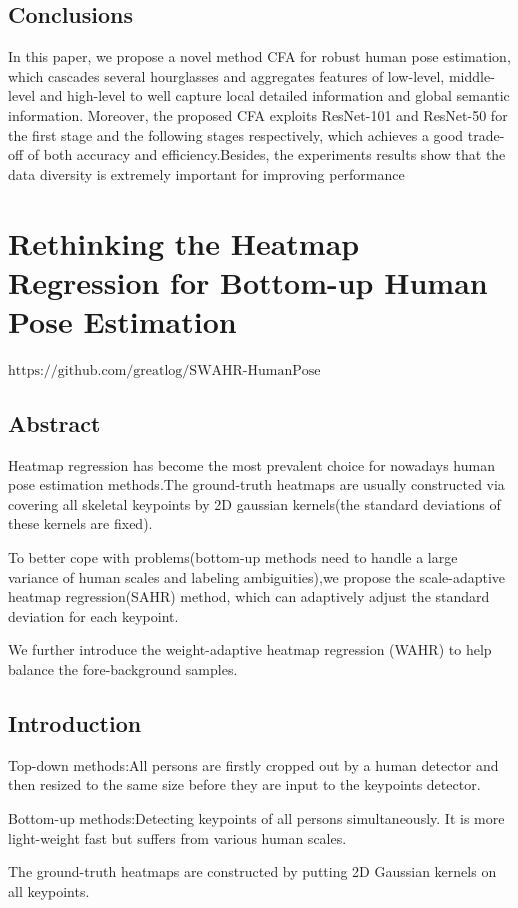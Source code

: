 \documentclass[11pt]{article}
\begin{document}
\subsection{Conclusions}
In this paper, we propose a novel method CFA for robust human pose estimation, which cascades 
several hourglasses and aggregates features of low-level, middle-level and high-level to well capture local detailed information and global semantic information. Moreover, the proposed CFA exploits ResNet-101 and ResNet-50 for the first stage and the following stages respectively, which achieves a good trade-off of both accuracy and efficiency.Besides, the experiments results show that the 
data diversity is extremely important for improving performance
\section{Rethinking the Heatmap Regression for Bottom-up Human Pose Estimation}
$\text{https://github.com/greatlog/SWAHR-HumanPose}$
\subsection{Abstract}
Heatmap regression has become the most prevalent choice for nowadays human pose estimation methods.The ground-truth heatmaps are usually constructed via covering all skeletal keypoints by 2D gaussian kernels(the standard deviations of these kernels are fixed).

To better cope with problems(bottom-up methods need to handle a large variance of human scales and labeling ambiguities),we propose the scale-adaptive heatmap regression(SAHR) method, which can adaptively adjust the standard deviation for each keypoint.

We further introduce the weight-adaptive heatmap regression (WAHR) to help balance the fore-background samples.
\subsection{Introduction}
Top-down methods:All persons are firstly cropped out by a human detector and then resized to the same size before they are input to the keypoints detector.

Bottom-up methods:Detecting keypoints of all persons simultaneously. It is more light-weight fast but suffers from various human scales.

The ground-truth heatmaps are constructed by putting 2D Gaussian kernels on all keypoints.
\end{document}
